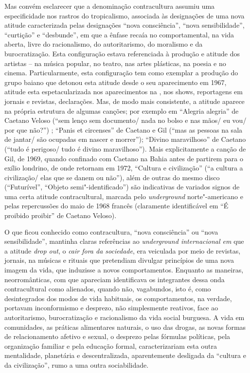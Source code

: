 Mas convém esclarecer que a denominação contracultura assumiu uma
especificidade nos rastros do tropicalismo, associada às designações de
uma nova atitude caracterizada pelas designações ``nova consciência'',
``nova sensibilidade'', ``curtição'' e ``desbunde'', em que a ênfase
recaía no comportamental, na vida aberta, livre do racionalismo, do
autoritarismo, do moralismo e da burocratização. Esta configuração
estava referenciada à produção e atitude dos artistas -- na música
popular, no teatro, nas artes plásticas, na poesia e no cinema.
Particularmente, esta configuração tem como exemplar a produção do grupo
baiano que detonou esta atitude desde o seu aparecimento em 1967,
atitude esta espetacularizada nos aparecimentos na , nos shows,
reportagens em jornais e revistas, declarações. Mas, de modo mais
consistente, a atitude aparece na própria estrutura de algumas canções;
por exemplo em ``Alegria alegria'' de Caetano Veloso (``sem lenço sem
documento/ nada no bolso e nas mãos/ eu vou/ por que não?'') ; ``Panis
et circenses'' de Caetano e Gil (``mas as pessoas na sala de jantar/ são
ocupadas em nascer e morrer''); ``Divino maravilhoso'' de Caetano
(``tudo é perigoso/ tudo é divino maravilhoso''). Mais explicitamente a
canção de Gil, de 1969, quando confinado com Caetano na Bahia antes de
partirem para o exílio londrino, de onde retornam em 1972, ``Cultura e
civilização'' (``a cultura a civilização/ elas que se danem ou não''),
além de outras do mesmo disco (``Futurível'', ``Objeto semi"-identificado'') são indicativas de variados signos de uma certa atitude
contracultural, marcada pelo \emph{underground} norte"-americano e
pelas repercussões do maio de 1968 francês (claramente identificável em
``É proibido proibir'' de Caetano Veloso).

O que ficou conhecido como contracultura, ``nova consciência'' ou ``nova
sensibilidade'', mantinha claras referências ao \emph{underground
internacional em} que a atitude \emph{drop out}, o \emph{cair fora da
sociedade}, era veiculada por meio de revistas, jornais, na músicas e
rituais que pretendiam divulgar princípios de uma nova imagem da vida,
que induzisse a novos comportamentos. Enquanto as maneiras,
neorromânticas, com que apareciam identificava os integrantes dessa onda
contracultural como alienados, quando não, vagabundos, isto é, como
desintegrados dos modos de vida habituais, os comportamentos, na
verdade, portavam inconformismo e desprezo, não simplesmente reativos,
face ao autoritarismo, burocratização e racionalismo da vida social
burguesa. A vida em comunidades, as práticas alimentares naturais, o uso
das drogas, as novas formas de relacionamento afetivo e sexual, o
desprezo pelas fórmulas políticas, pela organização familiar e pela
educação formal, caracterizariam esta outra mentalidade, planetária e
descentralizada, aparentemente desligada da ``cultura e da
civilização'', rumo a uma outra sociabilidade.

